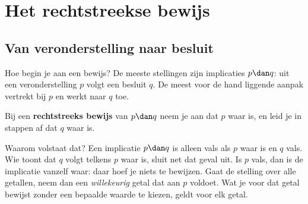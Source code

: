 
\begin{oefeningen}
\end{oefeningen}

\section{Het rechtstreekse bewijs}\label{sec:h2-rechtstreeks}

\subsection{Van veronderstelling naar besluit}

Hoe begin je aan een bewijs? De meeste stellingen zijn implicaties $p \dan q$: uit een veronderstelling $p$ volgt een besluit $q$. De meest voor de hand liggende aanpak vertrekt bij $p$ en werkt naar $q$ toe.

\begin{theorie}
Bij een \textbf{\textcolor{accent}{rechtstreeks bewijs}} van $p \dan q$ neem je aan dat $p$ waar is, en leid je in stappen af dat $q$ waar is.
\end{theorie}

Waarom volstaat dat? Een implicatie $p \dan q$ is alleen vals als $p$ waar is en $q$ vals. Wie toont dat $q$ volgt telkens $p$ waar is, sluit net dat geval uit. Is $p$ vals, dan is de implicatie vanzelf waar: daar hoef je niets te bewijzen. Gaat de stelling over alle getallen, neem dan een \textit{willekeurig} getal dat aan $p$ voldoet. Wat je voor dat getal bewijst zonder een bepaalde waarde te kiezen, geldt voor elk getal.

